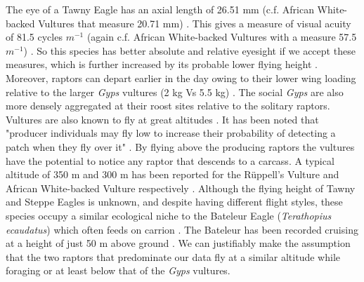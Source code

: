 The eye of a Tawny Eagle has an axial length of 26.51 mm (c.f. African White-backed Vultures that measure 20.71 mm) \citep{howland2004allometry}. This gives a measure of visual acuity of 81.5 cycles $m^{-1}$ (again c.f. African White-backed Vultures with a measure 57.5 $m^{-1}$) \citep{spiegel2013factors,howland2004allometry}. So this species has better absolute and relative eyesight if we accept these measures, which is further increased by its probable lower flying height \citep{mundy1992vultures}. Moreover, raptors can depart earlier in the day owing to their lower wing loading relative to the larger \textit{Gyps} vultures (2 kg Vs 5.5 kg) \citep{mundy1992vultures}. The social \textit{Gyps} are also more densely aggregated at their roost sites \citep{mundy1992vultures} relative to the solitary raptors. Vultures are also known to fly at great altitudes \citep{mundy1992vultures}. It has been noted that "producer individuals may fly low to increase their probability of detecting a patch when they fly over it" \citep{vickery1991producers}. By flying above the producing raptors the vultures have the potential to notice any raptor that descends to a carcass. A typical altitude of 350 m and 300 m has been reported for the R{\"u}ppell's Vulture and African White-backed Vulture respectively \citep{mundy1992vultures}. Although the flying height of Tawny and Steppe Eagles is unknown, and despite having different flight styles, these species occupy a similar ecological niche to the Bateleur Eagle (\textit{Terathopius ecaudatus}) which often feeds on carrion \citep{steyn1980breeding}. The Bateleur has been recorded cruising at a height of just 50 m above ground \citep{mundy1992vultures}. We can justifiably make the assumption that the two raptors that predominate our data fly at a similar altitude while foraging or at least below that of the \textit{Gyps} vultures.  

